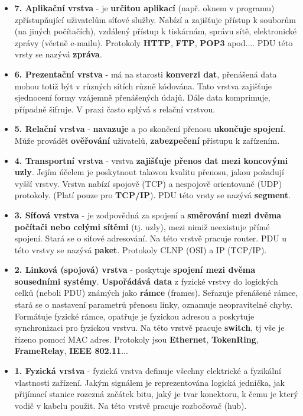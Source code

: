 \begin{itemize}
\item\textbf{7. Aplikační vrstva }- je \textbf{určitou aplikací} (např. oknem v programu) zpřístupňující uživatelům síťové služby. Nabízí a zajišťuje přístup k souborům (na jiných počítačích), vzdálený přístup k tiskárnám, správu sítě, elektronické zprávy (včetně e-mailu). Protokoly \textbf{HTTP}, \textbf{FTP}, \textbf{POP3} apod.... PDU této vrsty se nazývá \textbf{zpráva}.
\item\textbf{6. Prezentační vrstva} - má na starosti \textbf{konverzi dat}, přenášená data mohou totiž být v různých sítích různě kódována. Tato vrstva zajišťuje sjednocení formy vzájemně přenášených údajů. Dále data komprimuje, případně šifruje. V praxi často splývá s relační vrstvou.
\item \textbf{5. Relační vrstva} - \textbf{navazuje} a po skončení přenosu \textbf{ukončuje} \textbf{spojení}. Může provádět \textbf{ověřování} uživatelů, \textbf{zabezpečení} přístupu k zařízením.
\item\textbf{4. Transportní vrstva} - vrstva\textbf{ zajišťuje přenos dat mezi koncovými uzly}. Jejím účelem je poskytnout takovou kvalitu přenosu, jakou požadují vyšší vrstvy. Vrstva nabízí spojově (TCP) a nespojově orientované (UDP) protokoly. (Platí pouze pro \textbf{TCP/IP}). PDU této vrsty se nazývá \textbf{segment}.
\item\textbf{3. Síťová vrstva }- je zodpovědná za spojení a \textbf{směrování mezi dvěma počítači nebo celými sítěmi} (tj. uzly), mezi nimiž neexistuje přímé spojení. Stará se o síťové adresování. Na této vrstvě pracuje router. PDU u této vrstvy se nazývá \textbf{paket}. Protokoly CLNP (OSI) a IP (TCP/IP).
\item \textbf{2. Linková (spojová) vrstva }- poskytuje \textbf{spojení mezi dvěma sousedními systémy}. \textbf{Uspořádává data} z fyzické vrstvy do logických celků (neboli PDU) známých jako \textbf{rámce} (frames). Seřazuje přenášené rámce, stará se o nastavení parametrů přenosu linky, oznamuje neopravitelné chyby. Formátuje fyzické rámce, opatřuje je fyzickou adresou a poskytuje synchronizaci pro fyzickou vrstvu. Na této vrstvě pracuje \textbf{switch}, tj vše je řízeno pomocí MAC adres. Protokoly jsou \textbf{Ethernet}, \textbf{TokenRing}, \textbf{FrameRelay}, \textbf{IEEE 802.11}...
\item\textbf{1. Fyzická vrstva }- fyzická vrstva definuje všechny elektrické a fyzikální vlastnosti zařízení. Jakým signálem je reprezentována logická jednička, jak přijímací stanice rozezná začátek bitu, jaký je tvar konektoru, k čemu je který vodič v kabelu použit. Na této vrstvě pracuje rozbočovač (hub).
\end{itemize}

